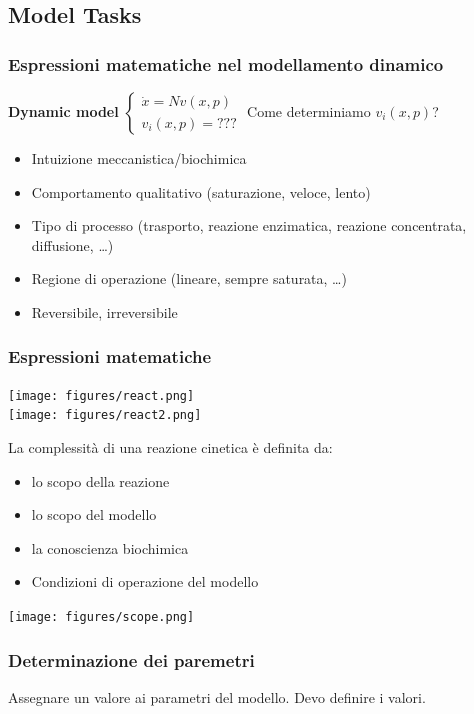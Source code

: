 \documentclass{article}
\begin{document}
\subsection{Model Tasks}
\subsubsection{Espressioni matematiche nel modellamento dinamico}
\textbf{Dynamic model} $\begin{cases}
    \dot{x} = Nv(x,p) \\
    v_i(x,p) = ??? 
  \end{cases}$
Come determiniamo $v_i(x,p)$?
\begin{itemize}
    \item Intuizione meccanistica/biochimica
    \item Comportamento qualitativo (saturazione, veloce, lento)
    \item Tipo di processo (trasporto, reazione enzimatica, reazione concentrata, diffusione, \dots)
    \item Regione di operazione (lineare, sempre saturata, \dots)
    \item Reversibile, irreversibile
\end{itemize}
\subsubsection{Espressioni matematiche}
\begin{center}
    \texttt{[image: figures/react.png]}\\
    \texttt{[image: figures/react2.png]}
\end{center}
La complessità di una reazione cinetica è definita da:
\begin{itemize}
    \item lo scopo della reazione
    \item lo scopo del modello
    \item la conoscienza biochimica
    \item[] Condizioni di operazione del modello
\end{itemize}
\begin{center}
    \texttt{[image: figures/scope.png]}\\
\end{center}
\subsubsection{Determinazione dei paremetri}
Assegnare un valore ai parametri del modello. Devo definire i valori.
\end{document}
